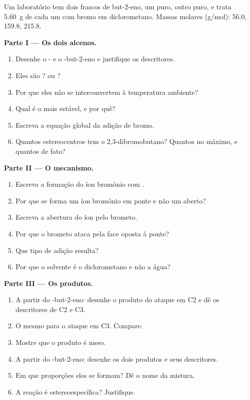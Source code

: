 \begin{problem}
\label{pb:b1:electrophilic-additions:1}
Um laboratório tem dois frascos de but-2-eno, um  puro, outro
 puro, e trata \qty{5.60}{g} de cada um com bromo em
diclorometano. Massas molares (\unit{g/mol}):  56.0, 
159.8,  215.8.

\medskip
\noindent\textbf{Parte I --- Os dois alcenos.}
\begin{enumerate}
  \item Desenhe o - e o -but-2-eno e justifique os descritores.
  \item Eles são ?  ou ?
  \item Por que eles não se interconvertem à temperatura ambiente?
  \item Qual é o mais estável, e por quê?
  \item Escreva a equação global da adição de bromo.
  \item Quantos estereocentros tem o 2,3-dibromobutano? Quantos
         no máximo, e quantos de fato?
\end{enumerate}

\medskip
\noindent\textbf{Parte II --- O mecanismo.}
\begin{enumerate}[resume]
  \item Escreva a formação do íon bromônio com .
  \item Por que se forma um íon bromônio em ponte e não um 
        aberto?
  \item Escreva a abertura do íon pelo brometo.
  \item Por que o brometo ataca pela face oposta à ponte?
  \item Que tipo de adição resulta?
  \item Por que o solvente é o diclorometano e não a água?
\end{enumerate}

\medskip
\noindent\textbf{Parte III --- Os produtos.}
\begin{enumerate}[resume]
  \item A partir do -but-2-eno: desenhe o produto do ataque em C2 e
        dê os descritores de C2 e C3.
  \item O mesmo para o ataque em C3. Compare.
  \item Mostre que o produto é meso.
  \item A partir do -but-2-eno: desenhe os dois produtos e seus
        descritores.
  \item Em que proporções eles se formam? Dê o nome da mistura.
  \item A reação é estereoespecífica? Justifique.
\end{enumerate}


\end{problem}
